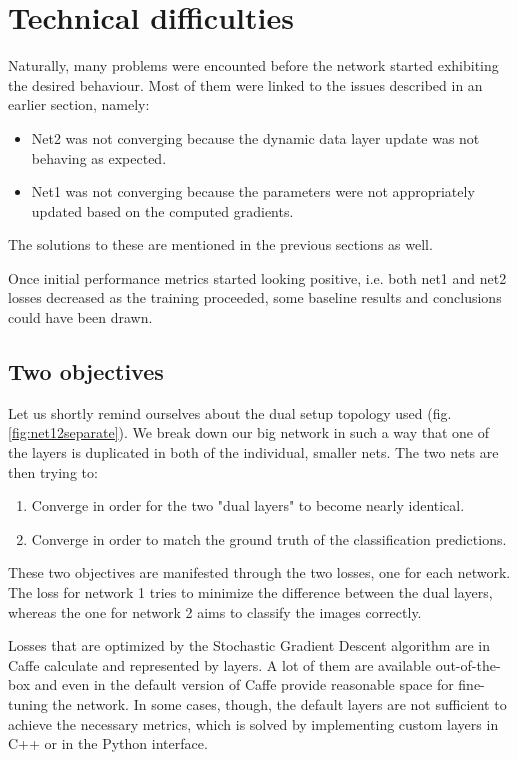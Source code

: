 \documentclass[a4paper, 11pt]{article}
\numberwithin{equation}{section}
\begin{document}
	\section{Technical difficulties}
	
	Naturally, many problems were encounted before the network started exhibiting the desired behaviour. Most of them were linked to the issues described in an earlier section, namely:
	
	\begin{itemize}
		\item Net2 was not converging because the dynamic data layer update was not behaving as expected.
		\item Net1 was not converging because the parameters were not appropriately updated based on the computed gradients.
	\end{itemize}
	
	The solutions to these are mentioned in the previous sections as well.
	
	Once initial performance metrics started looking positive, i.e. both net1 and net2 losses decreased as the training proceeded, some baseline results and conclusions could have been drawn.
	
	\subsection{Two objectives}
	
	Let us shortly remind ourselves about the dual setup topology used (fig. \ref{fig:net12separate}). We break down our big network in such a way that one of the layers is duplicated in both of the individual, smaller nets. The two nets are then trying to:
	\begin{enumerate}
		\item Converge in order for the two "dual layers" to become nearly identical.
		\item Converge in order to match the ground truth of the classification predictions.
	\end{enumerate}

	These two objectives are manifested through the two losses, one for each network. The loss for network 1 tries to minimize the difference between the dual layers, whereas the one for network 2 aims to classify the images correctly.
	
	Losses that are optimized by the Stochastic Gradient Descent algorithm are in Caffe calculate and represented by layers. A lot of them are available out-of-the-box and even in the default version of Caffe provide reasonable space for fine-tuning the network. In some cases, though, the default layers are not sufficient to achieve the necessary metrics, which is solved by implementing custom layers in C++ or in the Python interface.
		
\end{document}

